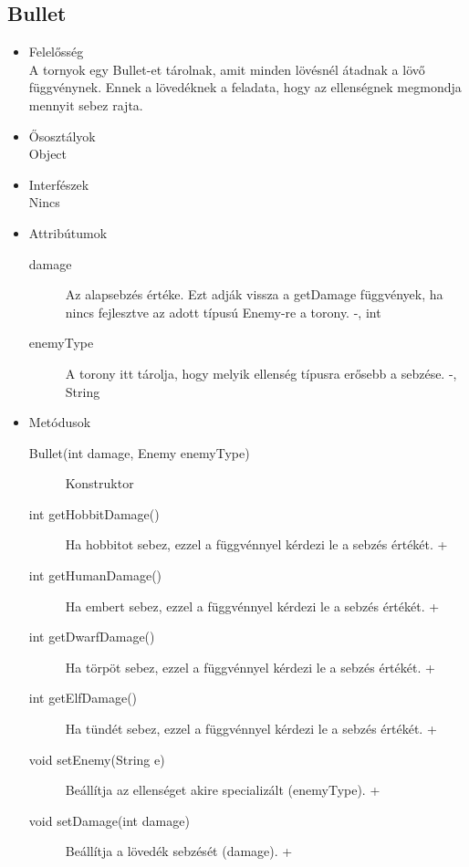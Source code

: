 \subsection{Bullet}
\begin{itemize}
\item Felelősség\\
A tornyok egy Bullet-et tárolnak, amit minden lövésnél átadnak a lövő függvénynek. Ennek a lövedéknek a feladata, hogy az ellenségnek megmondja mennyit sebez rajta.
\item Ősosztályok\\
Object
\item Interfészek\\
Nincs
\item Attribútumok\\
	\begin{description}
		\item[damage] Az alapsebzés értéke. Ezt adják vissza a getDamage függvények, ha nincs fejlesztve az adott típusú Enemy-re a torony. -, int
		\item[enemyType] A torony itt tárolja, hogy melyik ellenség típusra erősebb a sebzése. -, String
	\end{description}
\item Metódusok\\
	\begin{description}
		\item[Bullet(int damage, Enemy enemyType)] Konstruktor
\item[int getHobbitDamage()] Ha hobbitot sebez, ezzel a függvénnyel kérdezi le a sebzés értékét. + 
\item[int getHumanDamage()] Ha embert sebez, ezzel a függvénnyel kérdezi le a sebzés értékét. +
\item[int getDwarfDamage()] Ha törpöt sebez, ezzel a függvénnyel kérdezi le a sebzés értékét. +
\item[int getElfDamage()] Ha tündét sebez, ezzel a függvénnyel kérdezi le a sebzés értékét. +
\item[void setEnemy(String e)] Beállítja az ellenséget akire specializált (enemyType). +
\item[void setDamage(int damage)] Beállítja a lövedék sebzését (damage). +

	\end{description}
\end{itemize}


